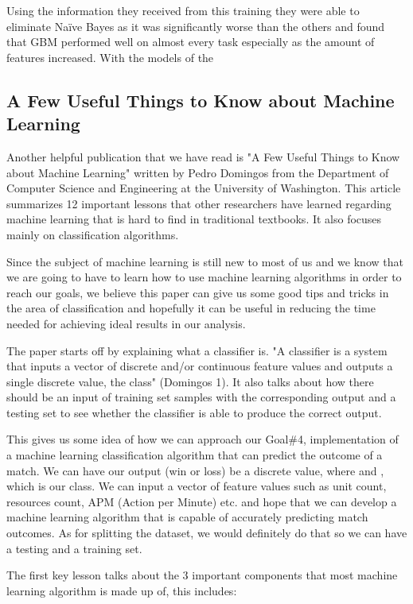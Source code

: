 \documentclass[a4paper,12pt]{report}
\begin{document}
Using the information they received from this training they were able to eliminate Naïve Bayes as it was significantly worse than the others and found that GBM performed well on almost every task especially as the amount of features increased. With the models of the

\subsection{A Few Useful Things to Know about Machine Learning}

Another helpful publication that we have read is "A Few Useful Things to Know about Machine Learning" written by Pedro Domingos from the Department of Computer Science and Engineering at the University of Washington. This article summarizes 12 important lessons that other researchers have learned regarding machine learning that is hard to find in traditional textbooks. It also focuses mainly on classification algorithms. 

Since the subject of machine learning is still new to most of us and we know that we are going to have to learn how to use machine learning algorithms in order to reach our goals, we believe this paper can give us some good tips and tricks in the area of classification and hopefully it can be useful in reducing the time needed for achieving ideal results in our analysis.

The paper starts off by explaining what a classifier is. "A classifier is a system that inputs a vector of discrete and/or continuous feature values and outputs a single discrete value, the class" (Domingos 1). It also talks about how there should be an input of training set samples with the corresponding output and a testing set to see whether the classifier is able to produce the correct output.

This gives us some idea of how we can approach our Goal\#4, implementation of a machine learning classification algorithm that can predict the outcome of a match. We can have our output (win or loss) be a discrete value, where  and , which is our class. We can input a vector of feature values such as unit count, resources count, APM (Action per Minute) etc. and hope that we can develop a machine learning algorithm that is capable of accurately predicting match outcomes. As for splitting the dataset, we would definitely do that so we can have a testing and a training set.

The first key lesson talks about the 3 important components that most machine learning algorithm is made up of, this includes:
\end{document}
